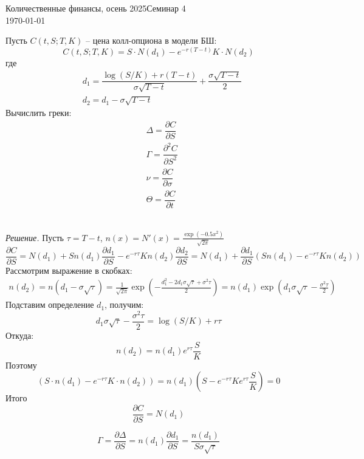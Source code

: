 \documentclass[12pt]{article}
\begin{document}
\noindent Количественные финансы, осень 2025\hfill Семинар 4\\
\today

\hrulefill

\begin{problem}
    Пусть $C(t, S; T, K)$ -- цена колл-опциона в модели БШ:
    $$C(t, S; T, K) = S \cdot N(d_1) - e^{-r(T-t)} K \cdot N(d_2)$$
    где 
    \begin{align*}
        &d_1 =\dfrac{\log(S / K) + r(T-t)}{\sigma{\sqrt{T-t}}} + \dfrac{\sigma{\sqrt{T-t}}}{2}\\
        &d_2 = d_1 - \sigma \sqrt{T-t}
    \end{align*}
    Вычислить греки:
    \begin{align*}
        &\Delta = \dfrac{\partial C}{\partial S} \\
        &\Gamma = \dfrac{\partial^2 C}{\partial S^2} \\
        &\nu = \dfrac{\partial C}{\partial \sigma} \\
        &\Theta = \dfrac{\partial C}{\partial t}
    \end{align*}
\end{problem}\\
\noindent \textit{Решение.} Пусть $\tau = T - t$, $n(x) = N'(x) = \frac{\exp(-0.5x^2)}{\sqrt{2\pi}}$
$$
    \dfrac{\partial C}{\partial S} = 
    N(d_1) + S n(d_1) \dfrac{\partial d_1}{\partial S}
    - e^{-r\tau} K n(d_2) \dfrac{\partial d_2}{\partial S}
    = N(d_1) + \dfrac{\partial d_1}{\partial S}
    \left( S n(d_1) - e^{-r\tau} K n(d_2) \right)
$$
Рассмотрим выражение в скобках:
\begin{align*}
    n(d_2) = n(d_1 - \sigma \sqrt{\tau})
    = \frac{1}{\sqrt{2\pi}} \exp(-\frac{d_1^2 - 2d_1 \sigma \sqrt{\tau} + \sigma^2 \tau}{2})
= n(d_1) \exp(d_1 \sigma \sqrt{\tau} - \frac{\sigma^2 \tau}{2})
\end{align*}
Подставим определение $d_1$, получим:
$$
    d_1 \sigma \sqrt{\tau} - \frac{\sigma^2 \tau}{2}
    = \log(S / K) + r\tau
$$Откуда:
$$
    n(d_2) = n(d_1) e^{r\tau} \dfrac{S}{K}
$$Поэтому
$$
\left( S \cdot n(d_1) - e^{-r\tau} K \cdot n(d_2)\right) 
= n(d_1) \left( S - e^{-r\tau} K e^{r\tau} \dfrac{S}{K}\right) = 0
$$Итого
$$
\dfrac{\partial C}{\partial S} = N(d_1)
$$

$$
    \Gamma = \dfrac{\partial \Delta}{\partial S}
    = n(d_1) \dfrac{\partial d_1}{\partial S}
    = \dfrac{n(d_1)}{S \sigma \sqrt{\tau}}
$$
\end{document}
